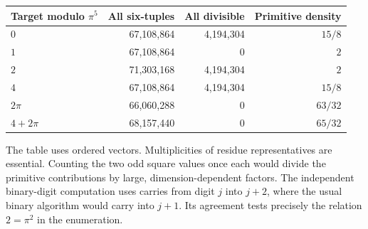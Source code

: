 \documentclass[12pt,letterpaper]{article}
\begin{document}
\begin{center}\small\begin{tabular}{lrrr}\toprule
Target modulo $\pi^5$&All six-tuples&All divisible&Primitive density\\\midrule
$0$ &67,108,864&4,194,304&$15/8$\\
$1$ &67,108,864&0&$2$\\
$2$ &71,303,168&4,194,304&$2$\\
$4$ &67,108,864&4,194,304&$15/8$\\
$2\pi$ &66,060,288&0&$63/32$\\
$4+2\pi$ &68,157,440&0&$65/32$\\\bottomrule
\end{tabular}\end{center}
The table uses ordered vectors. Multiplicities of residue representatives are essential. Counting the two odd square values once each would divide the primitive contributions by large, dimension-dependent factors. The independent binary-digit computation uses carries from digit $j$ into $j+2$, where the usual binary algorithm would carry into $j+1$. Its agreement tests precisely the relation $2=\pi^2$ in the enumeration.
\end{document}
